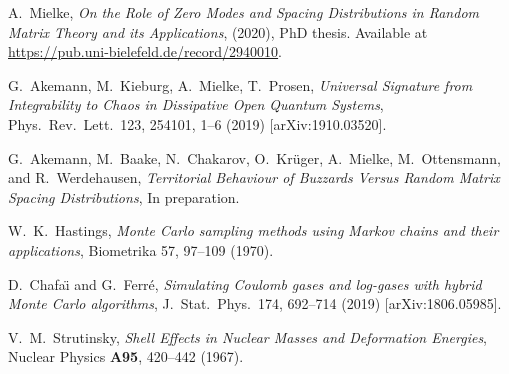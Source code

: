 \documentclass[a4paper,11pt]{article}
\numberwithin{equation}{section}
\begin{document}
\begin{thebibliography}{99}
	
 A.~Mielke, {\it On the Role of Zero Modes and Spacing Distributions in Random Matrix Theory and its Applications}, (2020), PhD thesis. Available at \url{https://pub.uni-bielefeld.de/record/2940010}.

 G.~Akemann, M.~Kieburg, A.~Mielke, T.~Prosen,
{\it Universal Signature from Integrability to Chaos in Dissipative Open Quantum Systems}, Phys.~Rev.~Lett.~123, 254101, 1--6 (2019)
[arXiv:1910.03520].

 G.~Akemann, M.~Baake, N.~Chakarov, O.~Kr\"{u}ger, A.~Mielke, M.~Ottensmann, and R.~Werdehausen, {\it Territorial Behaviour of Buzzards Versus Random Matrix Spacing Distributions}, In preparation.

 W.~K.~Hastings,
{\it Monte Carlo sampling methods using Markov chains and their applications},
Biometrika 57, 97--109 (1970).

 D.~Chafa\"{\i} and G.~Ferr\'{e},
{\it Simulating Coulomb gases and log-gases with hybrid Monte Carlo algorithms}, J.~Stat.~Phys.~174, 692--714 (2019) [arXiv:1806.05985].
	
	
 V.~M.~Strutinsky, {\it Shell Effects in Nuclear Masses and Deformation Energies}, Nuclear Physics \textbf{A95}, 420--442 (1967).

\end{thebibliography}
\end{document}
